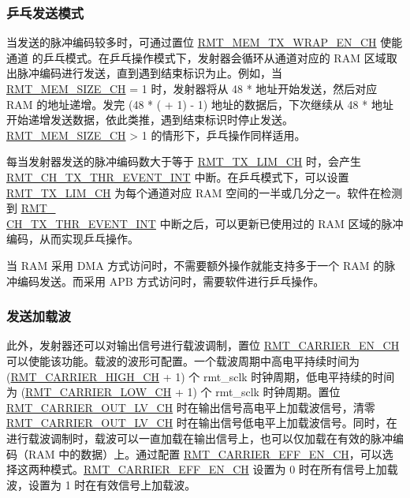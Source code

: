 \documentclass[main\_\_CN.tex]{subfiles}
\begin{document}
\subsubsection{乒乓发送模式}\label{sec:wrap-tx-mode}

当发送的脉冲编码较多时，可通过置位 \hyperref[fielddesc:RMTMEMTXWRAPENCHN]{RMT\_MEM\_TX\_WRAP\_EN\_CH} 使能通道  的乒乓模式。在乒乓操作模式下，发射器会循环从通道对应的 RAM 区域取出脉冲编码进行发送，直到遇到结束标识为止。例如，当 \hyperref[fielddesc:RMTMEMSIZECHN]{RMT\_MEM\_SIZE\_CH} = 1 时，发射器将从 48 *  地址开始发送，然后对应 RAM 的地址递增。发完 (48 * ( + 1) - 1) 地址的数据后，下次继续从 48 *  地址开始递增发送数据，依此类推，遇到结束标识时停止发送。\hyperref[fielddesc:RMTMEMSIZECHN]{RMT\_MEM\_SIZE\_CH} > 1 的情形下，乒乓操作同样适用。

每当发射器发送的脉冲编码数大于等于 \hyperref[fielddesc:RMTTXLIMCHN]{RMT\_TX\_LIM\_CH} 时，会产生 \hyperref[int:RMTCHnTXTHREVENTINT]{RMT\_CH\_TX\_THR\_EVENT\_INT} 中断。在乒乓模式下，可以设置 \hyperref[fielddesc:RMTTXLIMCHN]{RMT\_TX\_LIM\_CH} 为每个通道对应 RAM 空间的一半或几分之一。软件在检测到 \hyperref[int:RMTCHnTXTHREVENTINT]{RMT\_\\CH{}\_TX\_THR\_EVENT\_INT} 中断之后，可以更新已使用过的 RAM 区域的脉冲编码，从而实现乒乓操作。

\begin{tiplisting}
当 RAM 采用 DMA 方式访问时，不需要额外操作就能支持多于一个 RAM 的脉冲编码发送。而采用 APB 方式访问时，需要软件进行乒乓操作。
\end{tiplisting}

\subsubsection{发送加载波}

此外，发射器还可以对输出信号进行载波调制，置位 \hyperref[fielddesc:RMTCARRIERENCHN]{RMT\_CARRIER\_EN\_CH} 可以使能该功能。载波的波形可配置。一个载波周期中高电平持续时间为 (\hyperref[fielddesc:RMTCARRIERHIGHCHN]{RMT\_CARRIER\_HIGH\_CH} + 1) 个 rmt\_sclk 时钟周期，低电平持续的时间为 (\hyperref[fielddesc:RMTCARRIERLOWCHN]{RMT\_CARRIER\_LOW\_CH} + 1) 个 rmt\_sclk 时钟周期。置位 \hyperref[fielddesc:RMTCARRIEROUTLVCHN]{RMT\_CARRIER\_OUT\_LV\_CH} 时在输出信号高电平上加载波信号，清零 \hyperref[fielddesc:RMTCARRIEROUTLVCHN]{RMT\_CARRIER\_OUT\_LV\_CH} 时在输出信号低电平上加载波信号。同时，在进行载波调制时，载波可以一直加载在输出信号上，也可以仅加载在有效的脉冲编码（RAM 中的数据）上。通过配置 \hyperref[fielddesc:RMTCARRIEREFFENCHN]{RMT\_CARRIER\_EFF\_EN\_CH}，可以选择这两种模式。\hyperref[fielddesc:RMTCARRIEREFFENCHN]{RMT\_CARRIER\_EFF\_EN\_CH} 设置为 0 时在所有信号上加载波，设置为 1 时在有效信号上加载波。
\end{document}

